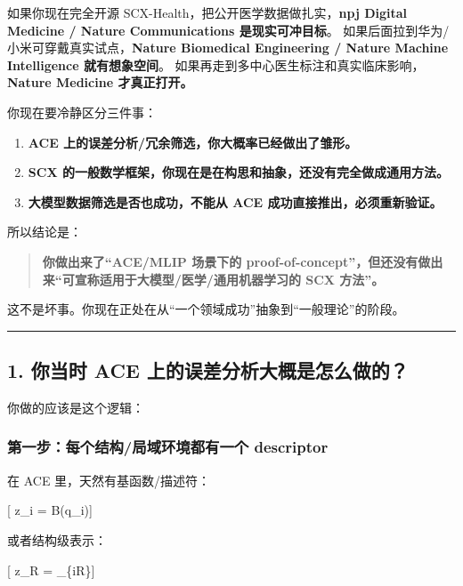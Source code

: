 \documentclass[
  12pt,
]{ctexart}
\providecommand{\tightlist}{%
  \setlength{\itemsep}{0pt}\setlength{\parskip}{0pt}}
\begin{document}
如果你现在完全开源 SCX-Health，把公开医学数据做扎实，\textbf{npj Digital
Medicine / Nature Communications 是现实可冲目标}。
如果后面拉到华为/小米可穿戴真实试点，\textbf{Nature Biomedical
Engineering / Nature Machine Intelligence 就有想象空间}。
如果再走到多中心医生标注和真实临床影响，\textbf{Nature Medicine
才真正打开。}

你现在要冷静区分三件事：

\begin{enumerate}
\def\labelenumi{\arabic{enumi}.}
\tightlist
\item
  \textbf{ACE 上的误差分析/冗余筛选，你大概率已经做出了雏形。}
\item
  \textbf{SCX
  的一般数学框架，你现在是在构思和抽象，还没有完全做成通用方法。}
\item
  \textbf{大模型数据筛选是否也成功，不能从 ACE
  成功直接推出，必须重新验证。}
\end{enumerate}

所以结论是：

\begin{quote}
\textbf{你做出来了``ACE/MLIP 场景下的
proof-of-concept''，但还没有做出来``可宣称适用于大模型/医学/通用机器学习的
SCX 方法''。}
\end{quote}

这不是坏事。你现在正处在从``一个领域成功''抽象到``一般理论''的阶段。

\begin{center}\rule{0.5\linewidth}{0.5pt}\end{center}

\subsection{1. 你当时 ACE
上的误差分析大概是怎么做的？}\label{ux4f60ux5f53ux65f6-ace-ux4e0aux7684ux8befux5deeux5206ux6790ux5927ux6982ux662fux600eux4e48ux505aux7684}

你做的应该是这个逻辑：

\subsubsection{第一步：每个结构/局域环境都有一个
descriptor}\label{ux7b2cux4e00ux6b65ux6bcfux4e2aux7ed3ux6784ux5c40ux57dfux73afux5883ux90fdux6709ux4e00ux4e2a-descriptor}

在 ACE 里，天然有基函数/描述符：

{[} z\_i = B(q\_i){]}

或者结构级表示：

{[} z\_R = \_\{i\in R\}{]}
\end{document}
